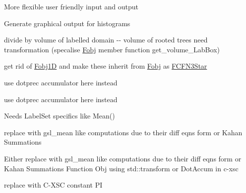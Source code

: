 
\begin{DoxyRefList}
\item[\label{todo__todo000002}%
\hypertarget{todo__todo000002}{}%
\-Page \hyperlink{AdaptiveHistograms}{\-Adaptive histograms} ]\-More flexible user friendly input and output 

\-Generate graphical output for histograms 
\item[\label{todo__todo000018}%
\hypertarget{todo__todo000018}{}%
\-Member \hyperlink{classFCFN3_aec0a3534e5961954300b910f7a7401da}{\-F\-C\-F\-N3\-:\-:operator()} (const \hyperlink{classLabBox}{\-Lab\-Box} \&\-X) const ]divide by volume of labelled domain -\/-\/ volume of rooted trees need transformation (specalise \hyperlink{classFobj}{\-Fobj} member function get\-\_\-volume\-\_\-\-Lab\-Box)  
\item[\label{todo__todo000019}%
\hypertarget{todo__todo000019}{}%
\-Class \hyperlink{classFLevy2D__Lkl__Tfrom1data}{\-F\-Levy2\-D\-\_\-\-Lkl\-\_\-\-Tfrom1data} ]get rid of \hyperlink{classFobj1D}{\-Fobj1\-D} and make these inherit from \hyperlink{classFobj}{\-Fobj} as \hyperlink{classFCFN3Star}{\-F\-C\-F\-N3\-Star}  
\item[\label{todo__todo000021}%
\hypertarget{todo__todo000021}{}%
\-Member \hyperlink{classFShiryaev1D__Lkl__aa__fromData_aa14358629387c248e96ccc8183fa9353}{\-F\-Shiryaev1\-D\-\_\-\-Lkl\-\_\-aa\-\_\-from\-Data\-:\-:operator()} (const \hyperlink{classLabPnt}{\-Lab\-Pnt} \&\-A) const ]use dotprec accumulator here instead  
\item[\label{todo__todo000020}%
\hypertarget{todo__todo000020}{}%
\-Member \hyperlink{classFShiryaev1D__Lkl__aa__fromData_ac3ef0d8ca7ece7015c1c79af2a85e261}{\-F\-Shiryaev1\-D\-\_\-\-Lkl\-\_\-aa\-\_\-from\-Data\-:\-:operator()} (const \hyperlink{classLabBox}{\-Lab\-Box} \&\-A) const ]use dotprec accumulator here instead  
\item[\label{todo__todo000011}%
\hypertarget{todo__todo000011}{}%
\-Member \hyperlink{classISSample_ab2913a50ee258c5b55d91202ac35ff00}{\-I\-S\-Sample\-:\-:\-Integral\-Estimate} (vector$<$ real $>$ \&\-Integral\-Ests)]\-Needs \-Label\-Set specifics like \-Mean() 

replace with gsl\-\_\-mean like computations due to their diff eqns form or \-Kahan \-Summations  
\item[\label{todo__todo000013}%
\hypertarget{todo__todo000013}{}%
\-Member \hyperlink{classISSample_a67d18d57af02d5adc0025eeb025db972}{\-I\-S\-Sample\-:\-:\-Mean} ()]\-Either replace with gsl\-\_\-mean like computations due to their diff eqns form or \-Kahan \-Summations \-Function \-Obj using std\-::transform or \-Dot\-Accum in c-\/xsc  
\item[\label{todo__todo000017}%
\hypertarget{todo__todo000017}{}%
\-Member \hyperlink{CesaroBellNo_8cpp_a3c04138a5bfe5d72780bb7e82a18e627}{main} (int argc, char $\ast$$\ast$argv)]replace with \-C-\/\-X\-S\-C constant \-P\-I 


\end{DoxyRefList}
